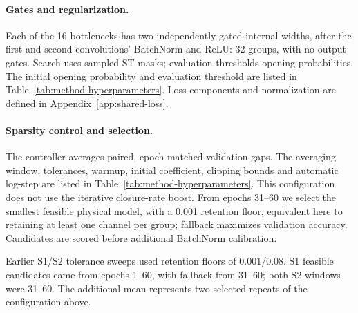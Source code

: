 \paragraph{Gates and regularization.}
Each of the 16 bottlenecks has two independently gated internal
widths, after the first and second convolutions' BatchNorm and ReLU:
32 groups, with no output gates. Search uses sampled ST masks;
evaluation thresholds opening probabilities. The initial opening
probability and evaluation threshold are listed in
Table~\ref{tab:method-hyperparameters}. Loss components and normalization
are defined in Appendix~\ref{app:shared-loss}.

\paragraph{Sparsity control and selection.}
The controller averages paired, epoch-matched validation gaps.
The averaging window, tolerances, warmup, initial coefficient, clipping
bounds and automatic log-step are listed in
Table~\ref{tab:method-hyperparameters}. This configuration does not use
the iterative closure-rate boost.
From epochs 31--60 we select the smallest feasible physical model,
with a 0.001 retention floor, equivalent here to retaining at least
one channel per group; fallback maximizes validation accuracy.
Candidates are scored before additional BatchNorm calibration.

Earlier S1/S2 tolerance sweeps used retention floors of
0.001/0.08. S1 feasible candidates came from epochs 1--60, with
fallback from 31--60; both S2 windows were 31--60. The additional
mean represents two selected repeats of the configuration above.
